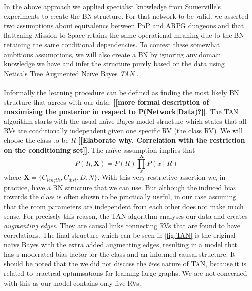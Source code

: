 \documentclass{UoYCSproject}
\begin{document}
\paragraph{}
In the above approach we applied specialist knowledge from Sumerville's experiments to create the BN structure. For that network to be valid, we asserted two assumptions about equivalence between PnP and ARPG dungeons and that flattening Mission to Space retains the same operational meaning due to the BN retaining the same conditional dependencies. To contest these somewhat ambitious assumptions, we will also create a BN by ignoring any domain knowledge we have and infer the structure purely based on the data using Netica's Tree Augmented Na\"{i}ve Bayes \textit{TAN} \parencite{FriedmanTAN}.  
\paragraph{}
Informally the learning procedure can be defined as finding the most likely BN structure that agrees with our data. \textbf{[[more formal description of maximising the posterior in respect to P(Network|Data)?]]}. The TAN algorithm starts with the usual na\"{i}ve Bayes model structure which states that all RVs are conditionally independent given one specific RV (the class RV). We will choose the class to be \(R\) \textbf{[[Elaborate why. Correlation with the restriction on the conditioning set]]}. The na\"{i}ve assumption implies that \[P(R,\boldsymbol X) = P(R)\prod_{x}^{\boldsymbol X} P(x \mid R)\] where \(\boldsymbol X = \{C_{length}, C_{dist}, D, N\}\). With this very restrictive assertion we, in practice, have a BN structure that we can use. But although the induced bias towards the class is often shown to be practically useful, in our case assuming that the room parameters are independent from each other does not make much sense. For precisely this reason, the TAN algorithm analyses our data and creates \textit{augmenting edges}. They are causal links connecting RVs that are found to have correlations. The final structure which can be seen in \ref{fig:TAN} is the original na\"{i}ve Bayes with the extra added augmenting edges, resulting in a model that has a moderated bias factor for the class and an informed causal structure. It should be noted that the we did not discuss the \textit{tree} nature of TAN, because it is related to practical optimisations for learning large graphs. We are not concerned with this as our model contains only five RVs.
\end{document}
